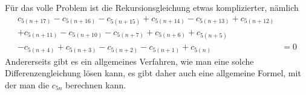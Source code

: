 Für das volle Problem ist die Rekursionsgleichung etwas komplizierter, nämlich
\begin{align*}
c_{5(n+17)} %
-c_{5(n+16)} %
-c_{5(n+15)} %
+c_{5(n+14)} %
-c_{5(n+13)} %
+c_{5(n+12)} %
&
\\
+c_{5(n+11)} %
-c_{5(n+10)} %
-c_{5(n+7)} %
+c_{5(n+6)} %
+c_{5(n+5)} %
&
\\
-c_{5(n+4)} %
+c_{5(n+3)} %
-c_{5(n+2)} %
-c_{5(n+1)} %
+c_{5(n)} %
&=0
\end{align*}
Andererseits gibt es ein allgemeines Verfahren, wie man eine solche
Differenzengleichung lösen kann, es gibt daher auch eine allgemeine
Formel, mit der man die $c_{5n}$ berechnen kann.




